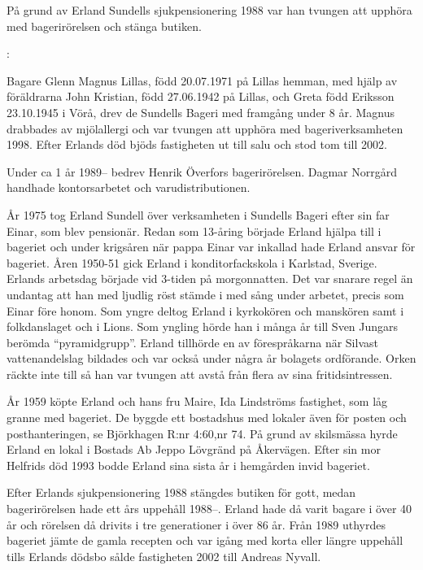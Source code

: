 \jhvspace{}

På grund av Erland Sundells sjukpensionering 1988 var han tvungen att upphöra med bagerirörelsen och stänga butiken.

:


Bagare Glenn Magnus Lillas, född 20.07.1971 på Lillas hemman, med hjälp av föräldrarna John Kristian, född 27.06.1942 på Lillas,	och Greta född Eriksson 23.10.1945 i Vörå, drev de Sundells Bageri med framgång under 8 år. Magnus drabbades av mjölallergi och var tvungen att upphöra med bageriverksamheten 1998. Efter Erlands död bjöds fastigheten ut till salu och stod tom till 2002.


Under ca 1 år 1989-- bedrev Henrik Överfors bagerirörelsen. Dagmar Norrgård handhade kontorsarbetet och varudistributionen.


År 1975 tog Erland Sundell över verksamheten i Sundells Bageri efter sin far Einar, som blev pensionär. Redan som 13-åring började Erland hjälpa till i bageriet och under krigsåren när pappa Einar var inkallad hade Erland ansvar för bageriet. Åren 1950-51 gick Erland i konditorfackskola i Karlstad, Sverige. Erlands arbetsdag började vid 3-tiden på morgonnatten. Det var snarare regel än undantag att han med ljudlig röst stämde i med sång under arbetet, precis som Einar före honom. Som yngre deltog Erland i kyrkokören och manskören samt i folkdanslaget och i Lions. Som yngling hörde han i många år till Sven Jungars berömda ``pyramidgrupp''.  Erland tillhörde en av förespråkarna när Silvast vattenandelslag bildades och var också under några år bolagets ordförande. Orken räckte inte till så han var tvungen att avstå från flera av sina fritidsintressen.

År 1959 köpte Erland och hans fru Maire, Ida Lindströms fastighet, som låg granne med bageriet. De byggde ett bostadshus med lokaler även för posten och posthanteringen, se Björkhagen R:nr 4:60,nr 74.  På grund av skilsmässa hyrde Erland en lokal i Bostads Ab Jeppo Lövgränd på Åkervägen. Efter sin mor Helfrids död 1993 bodde Erland sina sista år i hemgården invid bageriet.

Efter Erlands sjukpensionering 1988 stängdes butiken för gott, medan bagerirörelsen hade ett års uppehåll 1988--. Erland hade då varit bagare i över 40 år och rörelsen då drivits i tre generationer i över 86 år. Från 1989 uthyrdes bageriet jämte de gamla recepten och var igång med korta eller längre uppehåll tills Erlands dödsbo sålde fastigheten 2002 till Andreas Nyvall.

